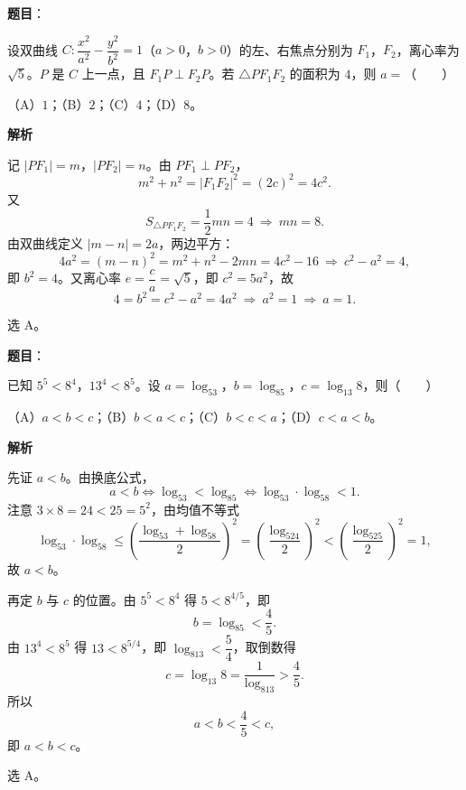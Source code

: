 \begin{answer}

\textbf{题目}：

设双曲线 $C:\dfrac{x^2}{a^2}-\dfrac{y^2}{b^2}=1$（$a>0$，$b>0$）的左、右焦点分别为 $F_1$，$F_2$，离心率为 $\sqrt5$。$P$ 是 $C$ 上一点，且 $F_1P\perp F_2P$。若 $\triangle PF_1F_2$ 的面积为 $4$，则 $a=$\mbox{（　　）}

（A）$1$；（B）$2$；（C）$4$；（D）$8$。

\textbf{解析}

记 $|PF_1|=m$，$|PF_2|=n$。由 $PF_1\perp PF_2$，
\nopagebreak[4]
\[m^2+n^2=|F_1F_2|^2=(2c)^2=4c^2 .\]
又
\nopagebreak[4]
\[S_{\triangle PF_1F_2}=\frac12mn=4\ \Longrightarrow\ mn=8 .\]
由双曲线定义 $|m-n|=2a$，两边平方：
\nopagebreak[4]
\[4a^2=(m-n)^2=m^2+n^2-2mn=4c^2-16\ \Longrightarrow\ c^2-a^2=4,\]
即 $b^2=4$。又离心率 $e=\dfrac ca=\sqrt5$，即 $c^2=5a^2$，故
\nopagebreak[4]
\[4=b^2=c^2-a^2=4a^2\ \Longrightarrow\ a^2=1\ \Longrightarrow\ a=1 .\]

选 A。


\end{answer}
\begin{answer}

\textbf{题目}：

已知 $5^5<8^4$，$13^4<8^5$。设 $a=\log_53$，$b=\log_85$，$c=\log_{13}8$，则\mbox{（　　）}

（A）$a<b<c$；（B）$b<a<c$；（C）$b<c<a$；（D）$c<a<b$。

\textbf{解析}

先证 $a<b$。由换底公式，
\nopagebreak[4]
\[a<b\iff\log_53<\log_85\iff\log_53\cdot\log_58<1 .\]
注意 $3\times8=24<25=5^2$，由均值不等式
\nopagebreak[4]
\[\log_53\cdot\log_58\leqslant\left(\frac{\log_53+\log_58}2\right)^2=\left(\frac{\log_524}2\right)^2<\left(\frac{\log_525}2\right)^2=1,\]
故 $a<b$。

再定 $b$ 与 $c$ 的位置。由 $5^5<8^4$ 得 $5<8^{4/5}$，即
\nopagebreak[4]
\[b=\log_85<\frac45 .\]
由 $13^4<8^5$ 得 $13<8^{5/4}$，即 $\log_813<\dfrac54$，取倒数得
\nopagebreak[4]
\[c=\log_{13}8=\frac1{\log_813}>\frac45 .\]
所以
\nopagebreak[4]
\[a<b<\frac45<c,\]
即 $a<b<c$。

选 A。


\end{answer}
